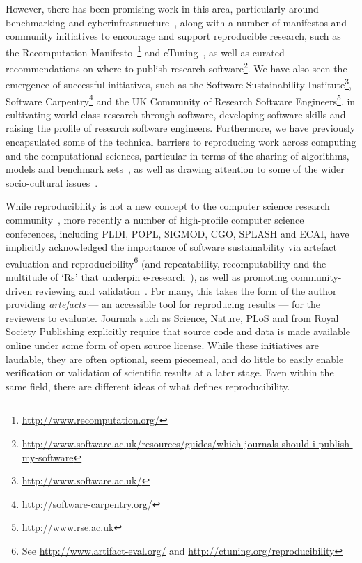 \documentclass[conference]{IEEEtran}
\begin{document}


However, there has been promising work in this area, particularly
around benchmarking and
cyberinfrastructure~\cite{sim-et-al:2003,chirigati-et-al:2013,stodden+miguez:2014,stodden-et-al:2015},
along with a number of manifestos and community initiatives to
encourage and support reproducible research, such as the Recomputation
Manifesto~\cite{gent:2013}\footnote{\url{http://www.recomputation.org/}}
and cTuning~\cite{fursin-et-al:2014}, as well as curated
recommendations on where to publish research
software\footnote{\url{http://www.software.ac.uk/resources/guides/which-journals-should-i-publish-my-software}}. We
have also seen the emergence of successful initiatives, such as the
Software Sustainability
Institute\footnote{\url{http://www.software.ac.uk/}}, Software
Carpentry\footnote{\url{http://software-carpentry.org/}} and the UK
Community of Research Software
Engineers\footnote{\url{http://www.rse.ac.uk}}, in cultivating
world-class research through software, developing software skills and
raising the profile of research software engineers. Furthermore, we
have previously encapsulated some of the technical barriers to
reproducing work across computing and the computational sciences,
particular in terms of the sharing of algorithms, models and benchmark
sets~\cite{crick-et-al_wssspe2,crick-et-al_recomp2014,crick-et-al:2015},
as well as drawing attention to some of the wider socio-cultural
issues~\cite{chuehong-et-al:2015}.

While reproducibility is not a new concept to the computer science
research community~\cite{price:1986}, more recently a number of
high-profile computer science conferences, including PLDI, POPL,
SIGMOD, CGO, SPLASH and ECAI, have implicitly acknowledged the
importance of software sustainability via artefact evaluation and
reproducibility\footnote{See \url{http://www.artifact-eval.org/} and
\url{http://ctuning.org/reproducibility}} (and repeatability,
recomputability and the multitude of `Rs' that underpin
e-research~\cite{deroure:2010,feitelson:2015}), as well as promoting
community-driven reviewing and validation~\cite{fursin+dubach:2014}.
For many, this takes the form of the author providing \emph{artefacts}
--- an accessible tool for reproducing results --- for the reviewers
to evaluate. Journals such as Science, Nature, PLoS and from Royal
Society Publishing explicitly require that source code and data is
made available online under some form of open source license. While
these initiatives are laudable, they are often optional, seem
piecemeal, and do little to easily enable verification or validation
of scientific results at a later stage. Even within the same field,
there are different ideas of what defines reproducibility.
\end{document}

